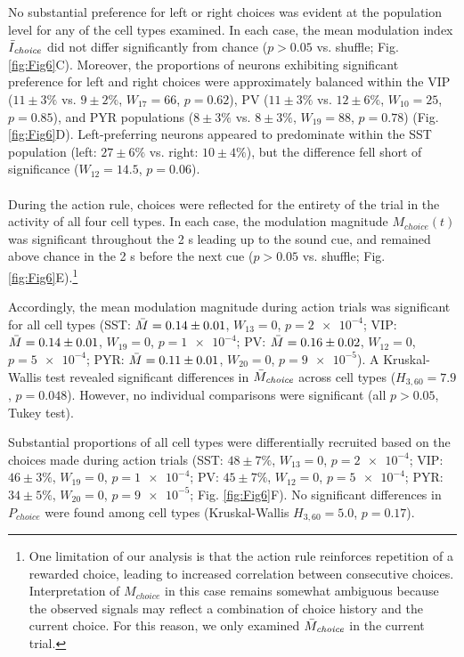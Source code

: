 No substantial preference for left or right choices was evident at the population level for any of the cell types examined. In each case, the mean modulation index $\Bar{I}_{\mathit{choice}}$ did not differ significantly from chance ($p>0.05$ vs. shuffle; Fig. \ref{fig:Fig6}C). Moreover, the proportions of neurons exhibiting significant preference for left and right choices were approximately balanced within the VIP ($11\pm3\%$ vs. $9\pm2\%$, $W_{17}=66$, $p=0.62$), PV ($11\pm3\%$ vs. $12\pm6\%$, $W_{10}=25$, $p=0.85$), and PYR populations ($8\pm3\%$ vs. $8\pm3\%$, $W_{19}=88$, $p=0.78$) (Fig. \ref{fig:Fig6}D). Left-preferring neurons appeared to predominate within the SST population (left: $27\pm6\%$ vs. right: $10\pm4\%$), but the difference fell short of significance ($W_{12}=14.5$, $p=0.06$).

\paragraph{}
During the action rule, choices were reflected for the entirety of the trial in the activity of all four cell types. In each case, the modulation magnitude $M_{\mathit{choice}}(t)$ was significant throughout the 2 s leading up to the sound cue, and remained above chance in the 2 s before the next cue ($p>0.05$ vs. shuffle; Fig. \ref{fig:Fig6}E).\footnote{One limitation of our analysis is that the action rule reinforces repetition of a rewarded choice, leading to increased correlation between consecutive choices. Interpretation of $M_{\mathit{choice}}$ in this case remains somewhat ambiguous because the observed signals may reflect a combination of choice history and the current choice. For this reason, we only examined $\Bar{M}_{\mathit{choice}}$ in the current trial.} 

Accordingly, the mean modulation magnitude during action trials was significant for all cell types (SST: $\Bar{M}=0.14\pm0.01$, $W_{13}=0$, $p=\num{2e-4}$; VIP: $\Bar{M}=0.14\pm0.01$, $W_{19}=0$, $p=\num{1e-4}$; PV: $\Bar{M}=0.16\pm0.02$, $W_{12}=0$, $p=\num{5e-4}$; PYR: $\Bar{M}=0.11\pm0.01$, $W_{20}=0$, $p=\num{9e-5}$). A Kruskal-Wallis test revealed significant differences in $\Bar{M}_{\mathit{choice}}$ across cell types ($H_{3,60}=7.9$, $p=0.048$). However, no individual comparisons were significant (all $p>0.05$, Tukey test). 

Substantial proportions of all cell types were differentially recruited based on the choices made during action trials (SST: $48\pm7\%$, $W_{13}=0$, $p=\num{2e-4}$; VIP: $46\pm3\%$, $W_{19}=0$, $p=\num{1e-4}$; PV: $45\pm7\%$, $W_{12}=0$, $p=\num{5e-4}$; PYR: $34\pm5\%$, $W_{20}=0$, $p=\num{9e-5}$; Fig. \ref{fig:Fig6}F). No significant differences in $P_{\mathit{choice}}$ were found among cell types (Kruskal-Wallis $H_{3,60}=5.0$, $p=0.17$).

